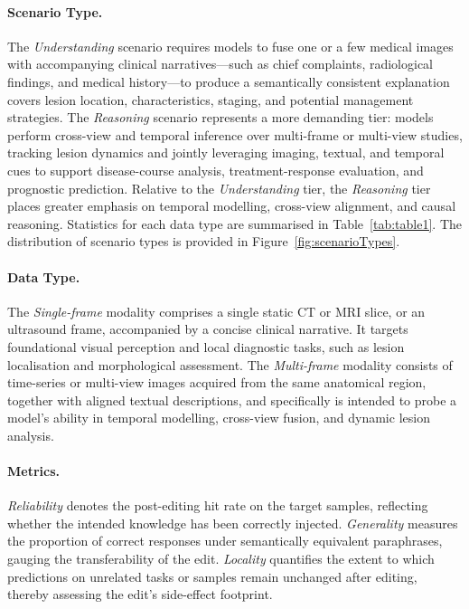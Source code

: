 \documentclass[letterpaper]{article} %
\begin{document}
\paragraph{Scenario Type.}
The \textit{Understanding} scenario requires models to fuse one or a few medical images with accompanying clinical narratives—such as chief complaints, radiological findings, and medical history—to produce a semantically consistent explanation covers lesion location, characteristics, staging, and potential management strategies. 
The \textit{Reasoning} scenario represents a more demanding tier: models perform cross-view and temporal inference over multi-frame or multi-view studies, tracking lesion dynamics and jointly leveraging imaging, textual, and temporal cues to support disease-course analysis, treatment-response evaluation, and prognostic prediction. 
Relative to the \textit{Understanding} tier, the \textit{Reasoning} tier places greater emphasis on temporal modelling, cross-view alignment, and causal reasoning. Statistics for each data type are summarised in Table~\ref{tab:table1}. The distribution of scenario types is provided in Figure~\ref{fig:scenarioTypes}.



\paragraph{Data Type.}
The \textit{Single-frame} modality comprises a single static CT or MRI slice, or an ultrasound frame, accompanied by a concise clinical narrative.  It targets foundational visual perception and local diagnostic tasks, such as lesion localisation and morphological assessment.  
The \textit{Multi-frame} modality consists of time-series or multi-view images acquired from the same anatomical region, together with aligned textual descriptions, and specifically is intended to probe a model’s ability in temporal modelling, cross-view fusion, and dynamic lesion analysis.  



\paragraph{Metrics.}

\textit{Reliability} denotes the post-editing hit rate on the target samples, reflecting whether the intended knowledge has been correctly injected. \textit{Generality} measures the proportion of correct responses under semantically equivalent paraphrases, gauging the transferability of the edit. \textit{Locality} quantifies the extent to which predictions on unrelated tasks or samples remain unchanged after editing, thereby assessing the edit’s side-effect footprint.
\end{document}

